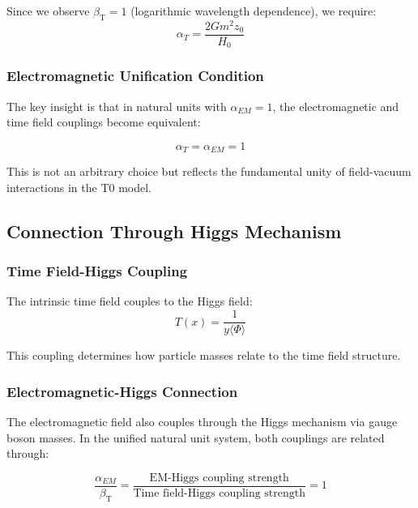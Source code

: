 \documentclass[12pt,a4paper]{article}
\newcommand{\betaT}{\beta_{\text{T}}}
\begin{document}
	Since we observe $\betaT = 1$ (logarithmic wavelength dependence), we require:
	\begin{equation}
		\alpha_T = \frac{2Gm^2 z_0}{H_0}
	\end{equation}
	
	\subsubsection{Electromagnetic Unification Condition}
	\label{subsubsec:em_unification}
	
	The key insight is that in natural units with $\alpha_{EM} = 1$, the electromagnetic and time field couplings become equivalent:
	
	\begin{equation}
		\boxed{\alpha_T = \alpha_{EM} = 1}
	\end{equation}
	
	This is not an arbitrary choice but reflects the fundamental unity of field-vacuum interactions in the T0 model.
	
	\subsection{Connection Through Higgs Mechanism}
	\label{subsec:higgs_mechanism_connection}
	
	\subsubsection{Time Field-Higgs Coupling}
	\label{subsubsec:time_higgs_coupling}
	
	The intrinsic time field couples to the Higgs field:
	\begin{equation}
		T(x) = \frac{1}{y\langle\Phi\rangle}
	\end{equation}
	
	This coupling determines how particle masses relate to the time field structure.
	
	\subsubsection{Electromagnetic-Higgs Connection}
	\label{subsubsec:em_higgs_connection}
	
	The electromagnetic field also couples through the Higgs mechanism via gauge boson masses. In the unified natural unit system, both couplings are related through:
	
	\begin{equation}
		\frac{\alpha_{EM}}{\betaT} = \frac{\text{EM-Higgs coupling strength}}{\text{Time field-Higgs coupling strength}} = 1
	\end{equation}
	
\end{document}
